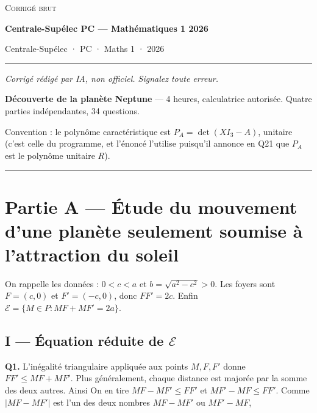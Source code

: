 \documentclass[11pt,a4paper]{article}
\newcommand{\equationajustee}[1]{%
  \sbox{\boiteequation}{$\displaystyle #1$}%
  \ifdim\wd\boiteequation>\linewidth
    \[\resizebox{\linewidth}{!}{\usebox{\boiteequation}}\]%
  \else
    \[#1\]%
  \fi}
\begin{document}
\thispagestyle{plain}
\begin{center}
  {\small\scshape Corrigé brut}\par\smallskip
  {\LARGE\bfseries Centrale-Supélec PC — Mathématiques 1 2026\par}\medskip
  {\large Centrale-Supélec · PC · Maths 1 · 2026\par}
\end{center}
\vspace{2pt}\hrule\vspace{8pt}

\emph{Corrigé rédigé par IA, non officiel. Signalez toute erreur.}

\textbf{Découverte de la planète Neptune} --- 4 heures, calculatrice autorisée. Quatre parties indépendantes, 34 questions.

Convention : le polynôme caractéristique est \(P_A=\det(XI_3-A)\), unitaire (c'est celle du programme, et l'énoncé l'utilise puisqu'il annonce en Q21 que \(P_A\) est le polynôme unitaire \(R\)).

\begin{center}\rule{0.5\linewidth}{0.5pt}\end{center}

\hypertarget{partie-a-uxe9tude-du-mouvement-dune-planuxe8te-seulement-soumise-uxe0-lattraction-du-soleil}{%
\section{Partie A --- Étude du mouvement d'une planète seulement soumise à l'attraction du soleil}\label{partie-a-uxe9tude-du-mouvement-dune-planuxe8te-seulement-soumise-uxe0-lattraction-du-soleil}}

On rappelle les données : \(0<c<a\) et \(b=\sqrt{a^2-c^2}>0\).
Les foyers sont \(F=(c,0)\) et \(F'=(-c,0)\), donc \(FF'=2c\).
Enfin \(\mathcal{E}=\{M\in P : MF+MF'=2a\}\).

\hypertarget{i-uxe9quation-ruxe9duite-de-mathcale}{%
\subsection{\texorpdfstring{I --- Équation réduite de \(\mathcal{E}\)}{I --- Équation réduite de \textbackslash mathcal\{E\}}}\label{i-uxe9quation-ruxe9duite-de-mathcale}}

\textbf{Q1.} L'inégalité triangulaire appliquée aux points \(M,F,F'\) donne \(FF'\leqslant MF+MF'\). Plus généralement, chaque distance est majorée par la somme des deux autres. Ainsi
\equationajustee{\begin{aligned}
MF&\leqslant MF'+F'F,\\
MF'&\leqslant MF+FF'.
\end{aligned}}
On en tire \(MF-MF'\leqslant FF'\) et \(MF'-MF\leqslant FF'\).
Comme \(|MF-MF'|\) est l'un des deux nombres \(MF-MF'\) ou \(MF'-MF\),
\equationajustee{\boxed{FF'\geqslant |MF-MF'|.}}
\end{document}
